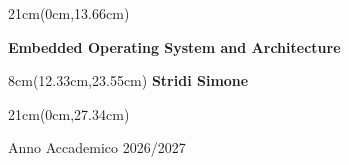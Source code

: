 \begin{titlepage}
\begin{textblock*}{21cm}(0cm,13.66cm)
	\fontsize{20}{24}\selectfont
	\centerline  {\textbf{Embedded Operating System and Architecture}}
\end{textblock*}


\fontsize{14}{17}\selectfont

\begin{textblock*}{8cm}(12.33cm,23.55cm)
	\noindent	\textbf{Stridi Simone}
\end{textblock*}


\begin{textblock*}{21cm}(0cm,27.34cm)
	\centerline{Anno Accademico 2026/2027}
\end{textblock*}

\end{titlepage}